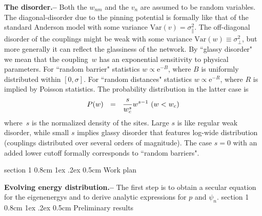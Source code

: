 \documentclass[onecolumn,fleqn,notitlepage,secnumarabic]{revtex4}
\makeatletter
\newcommand{\eexp}{\mbox{e}^}
\newcommand{\be}[1]{\begin{eqnarray}\ifthenelse{#1=-1}{\nonumber}{\ifthenelse{#1=0}{}{\label{e#1}}}}
\newcommand{\ee}{\end{eqnarray}}
\newcommand{\beq}{\be{1}}
\newcommand{\eeq}{\ee}
\newcommand{\sect}[1]{{\bf #1.-- }}
\def\section{%
  \@startsection
    {section}%
    {1}%
    {\z@}%
    {0.8cm \@plus1ex \@minus .2ex}%
    {0.5cm}%
    {\Large\bf }%
}%
\makeatother
\begin{document}
\sect{The disorder}
%
Both the $w_{nm}$ and the $v_n$ are assumed to 
be random variables. The diagonal-disorder due to the pinning
potential is formally like that of the standard Anderson model 
with some variance ${\mbox{Var}(v)=\sigma_{\parallel}^2}$.    
The off-diagonal disorder of the couplings might be 
weak with some variance ${\mbox{Var}(w) \equiv \sigma_{\perp}^2}$, 
but more generally it can reflect the glassiness of the network. 
%
By ``glassy disorder" we mean that the coupling~$w$ has an 
exponential sensitivity to physical parameters.  
For ``random barrier" statistics ${ w \propto \eexp{-B} }$, 
where $B$ is uniformly distributed within $[0,\sigma]$. 
For ``random distances" statistics ${ w \propto \eexp{-R} }$,
where $R$ is implied by Poisson statistics. 
The probability distribution in the latter case is 
%
\beq
P(w) \ \ = \ \ \frac{s}{w_c^{s}} w^{s-1} \ (w<w_c)
\eeq
%
where~$s$ is the normalized density of the sites.
Large $s$ is like regular weak disorder, while small $s$ 
implies glassy disorder that features log-wide distribution  
(couplings distributed over several orders of magnitude). 
The case $s=0$ with an added lower cutoff 
formally corresponds to ``random barriers". 



\section{Work plan}

{ \bf Evolving energy distribution.-- } The first step is to obtain a secular equation for the eigenenergys and to derive analytic expressions for $p$ and $\psi_n$. 
\section{Preliminary results} \label{sec:prelim}
\end{document}
